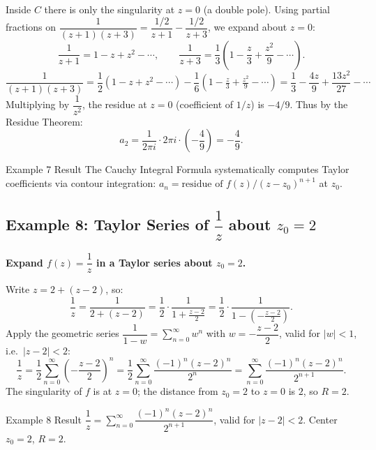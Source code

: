 \documentclass[12pt,a4paper]{article}
\begin{document}
Inside $C$ there is only the singularity at $z=0$ (a double pole). Using partial fractions on $\dfrac{1}{(z+1)(z+3)} = \dfrac{1/2}{z+1} - \dfrac{1/2}{z+3}$, we expand about $z=0$:
\[
  \frac{1}{z+1} = 1 - z + z^2 - \cdots,\qquad \frac{1}{z+3} = \frac{1}{3}\left(1 - \frac{z}{3} + \frac{z^2}{9}-\cdots\right).
\]
\[
  \frac{1}{(z+1)(z+3)} = \frac{1}{2}\!\left(1-z+z^2-\cdots\right) - \frac{1}{6}\!\left(1-\tfrac{z}{3}+\tfrac{z^2}{9}-\cdots\right)
  = \frac{1}{3} - \frac{4z}{9} + \frac{13z^2}{27} - \cdots
\]
Multiplying by $\dfrac{1}{z^2}$, the residue at $z=0$ (coefficient of $1/z$) is $-4/9$. Thus by the Residue Theorem:
\[
  a_2 = \frac{1}{2\pi i}\cdot 2\pi i \cdot\left(-\frac{4}{9}\right) = -\frac{4}{9}.
\]

\begin{learnbox}{Example 7 Result}
The Cauchy Integral Formula systematically computes Taylor coefficients via contour integration: $a_n = \text{residue of } f(z)/(z-z_0)^{n+1}$ at $z_0$.
\end{learnbox}

\subsection*{Example 8: Taylor Series of $\dfrac{1}{z}$ about $z_0 = 2$}

\textbf{Expand $f(z) = \dfrac{1}{z}$ in a Taylor series about $z_0 = 2$.}

\medskip
Write $z = 2 + (z-2)$, so:
\[
  \frac{1}{z} = \frac{1}{2+(z-2)} = \frac{1}{2}\cdot\frac{1}{1+\tfrac{z-2}{2}}
              = \frac{1}{2}\cdot\frac{1}{1-\left(-\tfrac{z-2}{2}\right)}.
\]
Apply the geometric series $\dfrac{1}{1-w} = \sum_{n=0}^{\infty} w^n$ with $w = -\dfrac{z-2}{2}$, valid for $|w|<1$, i.e.\ $|z-2|<2$:
\[
  \frac{1}{z} = \frac{1}{2}\sum_{n=0}^{\infty}\left(-\frac{z-2}{2}\right)^n
              = \frac{1}{2}\sum_{n=0}^{\infty}\frac{(-1)^n(z-2)^n}{2^n}
              = \sum_{n=0}^{\infty}\frac{(-1)^n(z-2)^n}{2^{n+1}}.
\]
The singularity of $f$ is at $z=0$; the distance from $z_0=2$ to $z=0$ is $2$, so $R = 2$. \checkmark

\begin{learnbox}{Example 8 Result}
$\dfrac{1}{z} = \displaystyle\sum_{n=0}^{\infty}\dfrac{(-1)^n(z-2)^n}{2^{n+1}}$, valid for $|z-2|<2$. Center $z_0=2$, $R=2$.
\end{learnbox}

\end{document}
